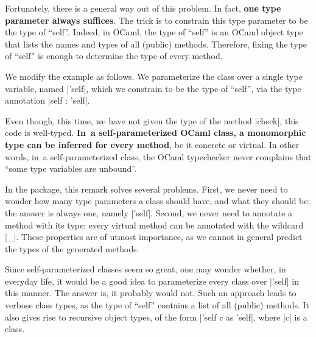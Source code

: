 \documentclass[11pt,a4paper,twoside]{article}
\renewcommand{\emph}[1]{\textbf{#1}}
\begin{document}
Fortunately, there is a general way out of this problem. In fact, \emph{one
  type parameter always suffices}. The trick is to constrain this type
parameter to be the type of ``self''. Indeed, in OCaml, the type of ``self''
is an OCaml object type that lists the names and types of all (public)
methods. Therefore, fixing the type of ``self'' is enough to determine the
type of every method.

%
%

We modify the example as follows. We parameterize the class over a single type
variable, named \oc|'self|, which we constrain to be the type of ``self'', via
the type annotation \oc|self : 'self|.
%

Even though, this time, we have not given the type of the method \oc|check|,
this code is well-typed. \emph{In~a self-parameterized OCaml class, a
  monomorphic type can be inferred for every method}, be it concrete or
virtual. In other words, in~a self-parameterized class, the OCaml typechecker
never complains that ``some type variables are unbound''.

In the \visitors package, this remark solves several problems. First, we never
need to wonder how many type parameters a class should have, and what they
should be: the answer is always one, namely \oc|'self|. Second, we never need
to annotate a method with its type: every virtual method can be annotated with
the wildcard \oc|_|. These properties are of utmost importance, as we cannot
in general predict the types of the generated methods.

Since self-parameterized classes seem so great, one may wonder whether, in
everyday life, it would be a good idea to parameterize every class over
\oc|'self| in this manner. The answer is, it probably would not. Such an
approach leads to verbose class types, as the type of ``self'' contains a list
of all (public) methods. It also gives rise to recursive object types, of the
form \oc|'self c as 'self|, where \oc|c| is a class.

\end{document}
